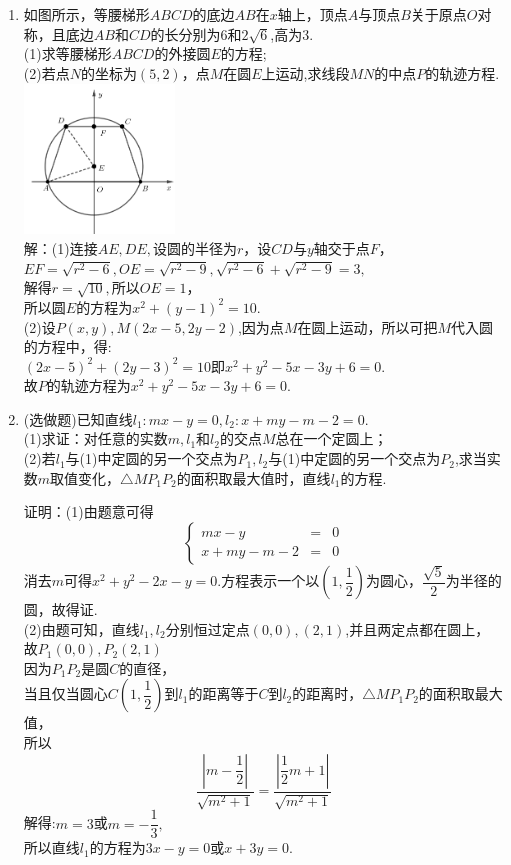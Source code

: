 \documentclass[12pt,twoside]{ctexart}
\begin{document}
\begin{enumerate}
%
%


\item 如图所示，等腰梯形$ABCD$的底边$AB$在$x$轴上，顶点$A$与顶点$B$关于原点$O$对称，且底边$AB$和$CD$的长分别为$6$和$2\sqrt{6}$,高为$3$.\\
(1)求等腰梯形$ABCD$的外接圆$E$的方程;\\
(2)若点$N$的坐标为$(5,2)$，点$M$在圆$E$上运动,求线段$MN$的中点$P$的轨迹方程.
\includegraphics[width=4cm,height=4cm]{121.png}\\
解：(1)连接$AE,DE,$设圆的半径为$r$，设$CD$与$y$轴交于点$F$，\\
$EF=\sqrt{r^2-6},OE=\sqrt{r^2-9},\sqrt{r^2-6}+\sqrt{r^2-9}=3,$\\
解得$r=\sqrt{10},$所以$OE=1$，\\
所以圆$E$的方程为$x^2+(y-1)^2=10$.\\
(2)设$P(x,y),M(2x-5,2y-2)$,因为点$M$在圆上运动，所以可把$M$代入圆的方程中，得:\\
$(2x-5)^2+(2y-3)^2=10$即$x^2+y^2-5x-3y+6=0$.\\
故$P$的轨迹方程为$x^2+y^2-5x-3y+6=0$.




\item (选做题)已知直线$l_1:mx-y=0,l_2:x+my-m-2=0$.\\
(1)求证：对任意的实数$m,l_1$和$l_2$的交点$M$总在一个定圆上；\\
(2)若$l_1$与(1)中定圆的另一个交点为$P_1,l_2$与(1)中定圆的另一个交点为$P_2$,求当实数$m$取值变化，$\triangle MP_1P_2$的面积取最大值时，直线$l_1$的方程.

证明：(1)由题意可得$$\left \{ \begin{aligned}
	mx-y & =&0 \\
	x+my-m-2 &= &0
\end{aligned}\right.$$
消去$m$可得$x^2+y^2-2x-y=0$.方程表示一个以$(1,\dfrac{1}{2})$为圆心，$\dfrac{\sqrt{5}}{2}$为半径的圆，故得证.\\
(2)由题可知，直线$l_1,l_2$分别恒过定点$(0,0),(2,1)$,并且两定点都在圆上，\\
故$P_1(0,0),P_2(2,1)$\\
因为$P_1P_2$是圆$C$的直径，\\
当且仅当圆心$C(1,\dfrac{1}{2})$到$l_1$的距离等于$C$到$l_2$的距离时，$\triangle MP_1P_2$的面积取最大值，\\
所以$$\dfrac{|m-\dfrac{1}{2}|}{\sqrt{m^2+1}}=\dfrac{|\dfrac{1}{2}m+1|}{\sqrt{m^2+1}}$$
解得:$m=3$或$m=-\dfrac{1}{3},$\\
所以直线$l_1$的方程为$3x-y=0$或$x+3y=0.$




\end{enumerate}
\end{document}
